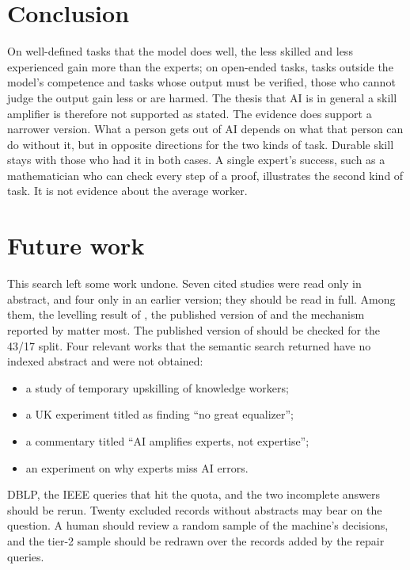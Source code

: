 \section{Conclusion}
\label{who-gains:conclusion}

On well-defined tasks that the model does well, the less skilled and
less experienced gain more than the experts; on open-ended tasks, tasks
outside the model's competence and tasks whose output must be verified,
those who cannot judge the output gain less or are harmed. The thesis
that AI is in general a skill amplifier is therefore not supported as
stated. The evidence does support a narrower version. What a person gets
out of AI depends on what that person can do without it, but in
opposite directions for the two kinds of task. Durable skill stays with
those who had it in both cases. A single expert's success, such as a
mathematician who can check every step of a proof, illustrates the
second kind of task. It is not evidence about the average worker.

\section{Future work}
\label{who-gains:future}

This search left some work undone. Seven cited studies were read only in
abstract, and four only in an earlier version; they should be read in
full. Among them, the levelling result of \textcite{Cui2026Effects},
the published version of \textcite{Noy2023Experimental} and the
mechanism reported by \textcite{Otis2026Uneven} matter most. The
published version of \textcite{DellAcqua2026Navigating} should be
checked for the 43/17 split. Four relevant works that the semantic search
returned have no indexed abstract and were not obtained:
\begin{itemize}
\item a study of temporary upskilling of knowledge workers;
\item a UK experiment titled as finding \enquote{no great equalizer};
\item a commentary titled \enquote{AI amplifies experts, not expertise};
\item an experiment on why experts miss AI errors.
\end{itemize}
DBLP, the IEEE queries that hit the quota, and the two incomplete
answers should be rerun. Twenty excluded records without abstracts may
bear on the question. A human should review a random sample of the
machine's decisions, and the tier-2 sample should be redrawn over the
records added by the repair queries.

